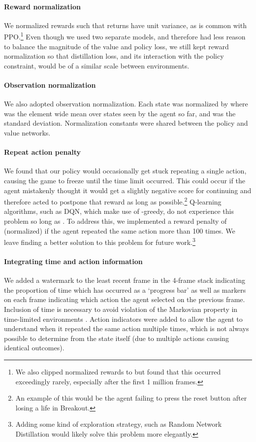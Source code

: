 \documentclass{article}
\begin{document}
\paragraph{Reward normalization} We normalized rewards such that returns have unit variance, as is common with PPO.\footnote{We also clipped normalized rewards to  but found that this occurred exceedingly rarely, especially after the first 1 million frames.} Even though we used two separate models, and therefore had less reason to balance the magnitude of the value and policy loss, we still kept reward normalization so that distillation loss, and its interaction with the policy constraint, would be of a similar scale between environments.

\paragraph{Observation normalization} We also adopted observation normalization. Each state  was normalized by  where  was the element wide mean over states seen by the agent so far, and  was the standard deviation. Normalization constants were shared between the policy and value networks.

\paragraph{Repeat action penalty} We found that our policy would occasionally get stuck repeating a single action, causing the game to freeze until the time limit occurred. This could occur if the agent mistakenly thought it would get a slightly negative score for continuing and therefore acted to postpone that reward as long as possible.\footnote{An example of this would be the agent failing to press the reset button after losing a life in Breakout.} Q-learning algorithms, such as DQN, which make use of -greedy, do not experience this problem so long as . To address this, we implemented a reward penalty of  (normalized) if the agent repeated the same action more than 100 times. We leave finding a better solution to this problem for future work.\footnote{Adding some kind of exploration strategy, such as Random Network Distillation \cite{burda2018exploration} would likely solve this problem more elegantly.}

\paragraph{Integrating time and action information} We added a watermark to the least recent frame in the 4-frame stack indicating the proportion of time which has occurred as a `progress bar' as well as markers on each frame indicating which action the agent selected on the previous frame. Inclusion of time is necessary to avoid violation of the Markovian property in time-limited environments \cite{pardo2018time}. Action indicators were added to allow the agent to understand when it repeated the same action multiple times, which is not always possible to determine from the state itself (due to multiple actions causing identical outcomes).
\end{document}
